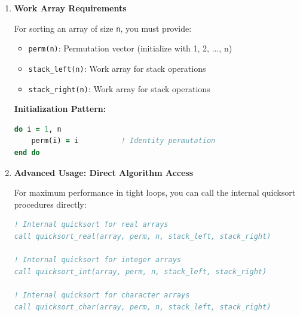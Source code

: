 \begin{enumerate}
\begin{enumerate}
\begin{itemize}
                    \item \textbf{Performance:} Average case O(n log n), worst case O(n²)
                          
                    \item \textbf{Stability:} Not stable (order of equal elements not preserved)
                  \end{itemize}
                  
            \item \textbf{Work Array Requirements}
                  
                  For sorting an array of size \texttt{n}, you must provide:
                  \begin{itemize}
                    \item \texttt{perm(n)}: Permutation vector (initialize with 1, 2, ...,
                          n)
                          
                    \item \texttt{stack\_left(n)}: Work array for stack operations
                          
                    \item \texttt{stack\_right(n)}: Work array for stack operations
                  \end{itemize}
                  
                  \textbf{Initialization Pattern:}
                  \begin{lstlisting}[language=Fortran]
do i = 1, n
    perm(i) = i          ! Identity permutation
end do
                  \end{lstlisting}
                  
            \item \textbf{Advanced Usage: Direct Algorithm Access}
                  
                  For maximum performance in tight loops, you can call the internal
                  quicksort procedures directly:
                  
                  \begin{lstlisting}[language=Fortran]
! Internal quicksort for real arrays
call quicksort_real(array, perm, n, stack_left, stack_right)

! Internal quicksort for integer arrays  
call quicksort_int(array, perm, n, stack_left, stack_right)

! Internal quicksort for character arrays
call quicksort_char(array, perm, n, stack_left, stack_right)
                  \end{lstlisting}
                  

\end{enumerate}
\end{enumerate}

